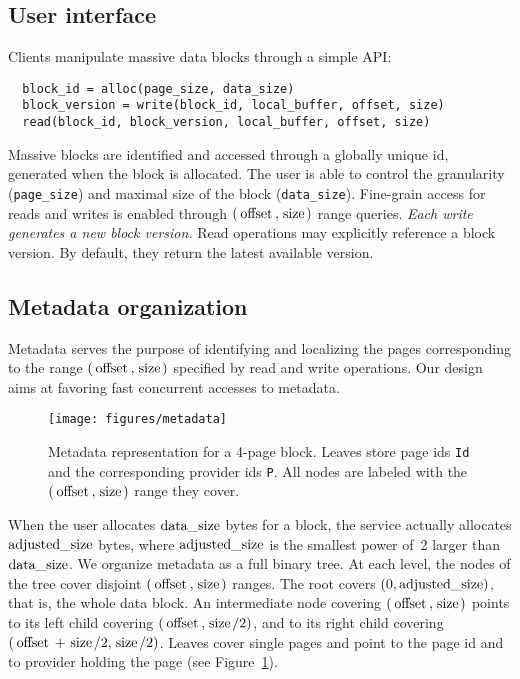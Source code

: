 \documentclass{llncs}
\newcommand{\myblock}[1]{\mbox{\lstinline{#1}}}
\newcommand{\myblockxspace}[1]{\myblock{#1}\xspace}
\newcommand{\Offset}{\myblockxspace{offset}}
\newcommand{\Size}{\myblockxspace{size}}
\newcommand{\Datasize}{\myblockxspace{data_size}}
\newcommand{\Adjustedsize}{\myblockxspace{adjusted_size}}
\begin{document}
\subsection{User interface}
\label{sec:API}

Clients manipulate massive data blocks through a simple API:
\begin{lstlisting}
  block_id = alloc(page_size, data_size)
  block_version = write(block_id, local_buffer, offset, size)
  read(block_id, block_version, local_buffer, offset, size)
\end{lstlisting}
Massive blocks are identified and accessed through a globally unique
id, generated when the block is allocated. The user is able to control
the granularity (\lstinline{page_size}) and maximal size of the block
(\lstinline{data_size}). Fine-grain access for reads and writes is enabled
through $(\Offset, \Size)$ range queries. \emph{Each write generates a new
block version.} Read operations may explicitly reference a block
version. By default, they return the latest available version.



\subsection{Metadata organization}
\label{sec:metadata}

Metadata serves the purpose of identifying and localizing the pages
corresponding to the range $(\Offset, \Size)$ specified by read and
write operations. Our design aims at favoring fast concurrent accesses
to metadata.

\begin{figure}
  \centerline{\texttt{[image: figures/metadata]}}\caption{Metadata representation for a 4-page block. Leaves store
    page ids \myblock{Id} and the corresponding provider ids
    \myblock{P}.
All nodes are
    labeled with the $(\Offset,\Size)$ range they cover.}\label{fig:metadata}
\end{figure}

When the user allocates $\Datasize$ bytes for a block, the service
actually allocates $\Adjustedsize$ bytes, where $\Adjustedsize$ is
the smallest power of~2 larger than $\Datasize$. We organize metadata
as a full binary tree. At each level, the nodes of the tree cover disjoint $(\Offset,
\Size)$ ranges. The root covers $(0, \Adjustedsize)$, that is, the whole
data block.  An intermediate node covering $(\Offset, \Size)$ points to its
left child covering $(\Offset, \Size / 2)$, and to its right child
covering $(\Offset + \Size / 2, \Size / 2)$. Leaves cover single pages
and point to the page id and to provider holding the page (see
Figure~\ref{fig:metadata}).
\end{document}
